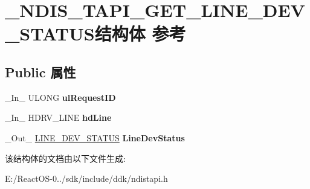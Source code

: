 \hypertarget{struct___n_d_i_s___t_a_p_i___g_e_t___l_i_n_e___d_e_v___s_t_a_t_u_s}{}\section{\+\_\+\+N\+D\+I\+S\+\_\+\+T\+A\+P\+I\+\_\+\+G\+E\+T\+\_\+\+L\+I\+N\+E\+\_\+\+D\+E\+V\+\_\+\+S\+T\+A\+T\+U\+S结构体 参考}
\label{struct___n_d_i_s___t_a_p_i___g_e_t___l_i_n_e___d_e_v___s_t_a_t_u_s}
\subsection*{Public 属性}
\begin{DoxyCompactItemize}
\item 
\mbox{\label{struct___n_d_i_s___t_a_p_i___g_e_t___l_i_n_e___d_e_v___s_t_a_t_u_s_ad5687eb5c0984dc5ac0ab53308a37250}} 
\+\_\+\+In\+\_\+ U\+L\+O\+NG {\bfseries ul\+Request\+ID}
\item 
\mbox{\label{struct___n_d_i_s___t_a_p_i___g_e_t___l_i_n_e___d_e_v___s_t_a_t_u_s_acb3574175990e74f3ae3f8fbca979719}} 
\+\_\+\+In\+\_\+ H\+D\+R\+V\+\_\+\+L\+I\+NE {\bfseries hd\+Line}
\item 
\mbox{\label{struct___n_d_i_s___t_a_p_i___g_e_t___l_i_n_e___d_e_v___s_t_a_t_u_s_a766872d2cb777689561123bd548448b1}} 
\+\_\+\+Out\+\_\+ \hyperlink{struct___l_i_n_e___d_e_v___s_t_a_t_u_s}{L\+I\+N\+E\+\_\+\+D\+E\+V\+\_\+\+S\+T\+A\+T\+US} {\bfseries Line\+Dev\+Status}
\end{DoxyCompactItemize}


该结构体的文档由以下文件生成\+:\begin{DoxyCompactItemize}
\item 
E\+:/\+React\+O\+S-\/0../sdk/include/ddk/ndistapi.\+h\end{DoxyCompactItemize}
